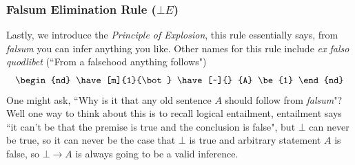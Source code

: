\subsubsection{Falsum Elimination Rule ($\bot E$)}
Lastly, we introduce the \textit{Principle of Explosion}, this rule essentially says, from \textit{falsum} you can infer anything you like. Other names for this rule include \textit{ex falso quodlibet} (``From a falsehood anything follows")
\begin{equation}
    \begin{nd}
        \have[m]{1}{\bot}
        \have[~]{} {A} \be{1}
    \end{nd} \nonumber
\end{equation}
One might ask, ``Why is it that any old sentence $A$ should follow from \textit{falsum}"? Well one way to think about this is to recall logical entailment, entailment says ``it can't be that the premise is true and the conclusion is false", but $\bot$ can never be true, so it can never be the case that $\bot$ is true and arbitrary statement $A$ is false, so $\bot \rightarrow A$ is always going to be a valid inference.

